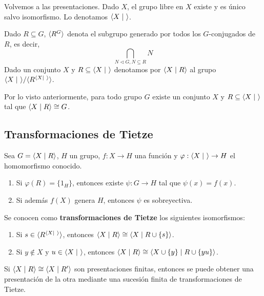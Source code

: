 \documentclass[twoside, 11pt]{article}
\begin{document}
Volvemos a las presentaciones. Dado $X$, el grupo libre en $X$ existe y es único salvo isomorfismo. Lo denotamos $\langle{X\mid\ }\rangle$. 

Dado $R\subseteq G$, $\langle{R^G}\rangle$ denota el subgrupo generado por todos los $G$-conjugados de $R$, es decir, $$\bigcap_{N\triangleleft G, N\subseteq R} N$$
Dado un conjunto $X$ y $R\subseteq\langle{X\mid\ }\rangle$ denotamos por $\langle{X\mid R}\rangle$ al grupo $\gene{X\mid\ }/\gene{R^{\gene{X\mid\ }}}$.

Por lo visto anteriormente, para todo grupo $G$ existe un conjunto $X$ y $R\subseteq\langle{X\mid\ }\rangle$ tal que $\langle{X\mid R}\rangle\cong G$.
\subsection{Transformaciones de Tietze}
\begin{teorema}
Sea $G=\langle{X\mid R}\rangle$, $H$ un grupo, $f:X\to H$ una función y $\varphi:\langle{X\mid\ }\rangle\to H$ el homomorfismo conocido. 
\begin{enumerate}
\item Si $\varphi(R)=\{	1_H\}$, entonces existe $\psi:G\to H$ tal que $\psi(x)=f(x)$.
\item Si además $f(X)$ genera $H$, entonces $\psi$ es sobreyectiva.
\end{enumerate}
\end{teorema}

Se conocen como \textbf{transformaciones de Tietze} los siguientes isomorfismos:
\begin{enumerate}
\item Si $s\in \gene{R^{\gene{X\mid\ }}}$, entonces $\langle{X\mid R}\rangle\cong\langle{X\mid R\cup\{s\}}\rangle$.
\item Si $y\notin X$ y $u\in\langle{X\mid\ }\rangle$, entonces $\langle{X\mid R}\rangle\cong \langle{X\cup \{y\}\mid R\cup \{yu\}}\rangle$.
\end{enumerate}

\begin{teorema}
Si $\langle{X\mid R}\rangle\cong\langle{X\mid R'}\rangle$ son presentaciones finitas, entonces se puede obtener una presentación de la otra mediante una sucesión finita de transformaciones de Tietze.
\end{teorema}
\end{document}
